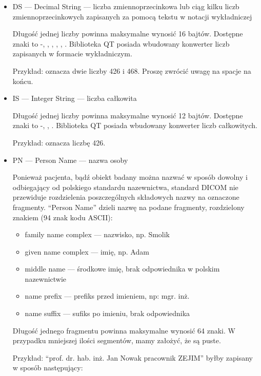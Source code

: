 \begin{itemize}
    \item DS --- Decimal String --- liczba zmiennoprzecinkowa lub ciąg kilku liczb zmiennoprzecinkowych zapisanych za pomocą tekstu w notacji wykładniczej

          Długość jednej liczby powinna maksymalne wynosić 16 bajtów.
          Dostępne znaki to -, \dataword{+}, \dataword{-}, , , .
          Biblioteka QT posiada wbudowany konwerter liczb zapisanych w formacie wykładniczym.

          Przykład:  oznacza dwie liczby 426 i 468. Proszę zwrócić uwagę na spacje na końcu.

    \item IS --- Integer String --- liczba całkowita

          Długość jednej liczby powinna maksymalne wynosić 12 bajtów.
          Dostępne znaki to -, \dataword{+}, \dataword{-}.
          Biblioteka QT posiada wbudowany konwerter liczb całkowitych.

          Przykład:   oznacza liczbę 426.

    \item PN --- Person Name --- nazwa osoby

          Ponieważ pacjenta, bądź obiekt badany można nazwać w sposób dowolny i odbiegający od polskiego standardu nazewnictwa, standard DICOM nie przewiduje rozdzielenia poszczególnych składowych nazwy na oznaczone fragmenty.
          \enquote{Person Name} dzieli nazwę na podane fragmenty, rozdzielony znakiem \dataword{\^{}} (94 znak kodu ASCII):
          \begin{itemize}
              \item family name complex --- nazwisko, np. Smolik
              \item given name complex --- imię, np. Adam
              \item middle name --- środkowe imię, brak odpowiednika w polskim nazewnictwie
              \item name prefix --- prefiks przed imieniem, np: mgr. inż.
              \item name suffix --- sufiks po imieniu, brak odpowiednika
          \end{itemize}
          Długość jednego fragmentu powinna maksymalne wynosić 64 znaki.
          W przypadku mniejszej ilości segmentów, mamy założyć, że są puste.

          Przykład: \enquote{prof. dr. hab. inż. Jan Nowak pracownik ZEJIM} byłby zapisany w sposób następujący: 


\end{itemize}
